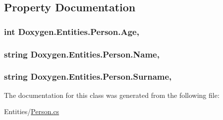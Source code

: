 \subsection{Property Documentation}
\hypertarget{class_doxygen_1_1_entities_1_1_person_a9f8599c630b0e103bfd1081e9c9aa888}{
\subsubsection[{Age}]{\setlength{\rightskip}{0pt plus 5cm}int Doxygen.\+Entities.\+Person.\+Age\hspace{0.3cm}{\ttfamily [get]}, {\ttfamily [set]}}}\label{class_doxygen_1_1_entities_1_1_person_a9f8599c630b0e103bfd1081e9c9aa888}
\hypertarget{class_doxygen_1_1_entities_1_1_person_abe1c1357f677dd55a4b2aa2c42d3ca41}{
\subsubsection[{Name}]{\setlength{\rightskip}{0pt plus 5cm}string Doxygen.\+Entities.\+Person.\+Name\hspace{0.3cm}{\ttfamily [get]}, {\ttfamily [set]}}}\label{class_doxygen_1_1_entities_1_1_person_abe1c1357f677dd55a4b2aa2c42d3ca41}
\hypertarget{class_doxygen_1_1_entities_1_1_person_a60a3fd51dedab2d55857a21f5ecdb6f4}{
\subsubsection[{Surname}]{\setlength{\rightskip}{0pt plus 5cm}string Doxygen.\+Entities.\+Person.\+Surname\hspace{0.3cm}{\ttfamily [get]}, {\ttfamily [set]}}}\label{class_doxygen_1_1_entities_1_1_person_a60a3fd51dedab2d55857a21f5ecdb6f4}


The documentation for this class was generated from the following file\+:\begin{DoxyCompactItemize}
\item 
Entities/\hyperlink{_person_8cs}{Person.\+cs}\end{DoxyCompactItemize}
